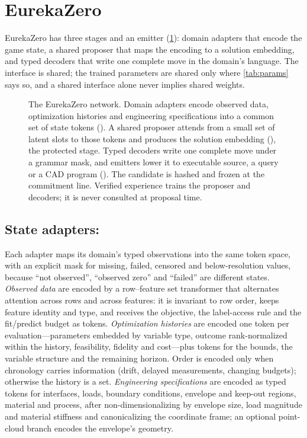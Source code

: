 \section{EurekaZero}
\label{sec:architecture}

EurekaZero has three stages and an emitter (\cref{fig:network}): domain adapters that encode the game
state, a shared proposer that maps the encoding to a solution embedding, and typed decoders that write
one complete move in the domain's language. The interface is shared; the trained parameters are
shared only where \cref{tab:params} says so, and a shared interface alone never implies shared
weights.

\begin{figure}[t]
\centering

\caption{The EurekaZero network. Domain adapters encode observed data, optimization histories and
engineering specifications into a common set of state tokens (). A shared
proposer attends from a small set of latent slots to those tokens and produces the solution embedding
(), the protected stage. Typed decoders write one complete move under a
grammar mask, and emitters lower it to executable source, a query or a CAD program
(). The candidate is hashed and frozen at the commitment line. Verified experience
trains the proposer and decoders; it is never consulted at proposal time.}
\label{fig:network}
\end{figure}

\subsection{State adapters: \texorpdfstring{}{game\_state\_encoding}}

Each adapter maps its domain's typed observations into the same token space, with an explicit mask for
missing, failed, censored and below-resolution values, because ``not observed'', ``observed zero'' and
``failed'' are different states.
\emph{Observed data} are encoded by a row--feature set transformer that alternates attention across
rows and across features: it is invariant to row order, keeps feature identity and type, and receives
the objective, the label-access rule and the fit/predict budget as tokens.
\emph{Optimization histories} are encoded one token per evaluation---parameters embedded by variable
type, outcome rank-normalized within the history, feasibility, fidelity and cost---plus tokens for the
bounds, the variable structure and the remaining horizon. Order is encoded only when chronology
carries information (drift, delayed measurements, changing budgets); otherwise the history is a set.
\emph{Engineering specifications} are encoded as typed tokens for interfaces, loads, boundary
conditions, envelope and keep-out regions, material and process, after non-dimensionalizing by
envelope size, load magnitude and material stiffness and canonicalizing the coordinate frame; an
optional point-cloud branch encodes the envelope's geometry.

